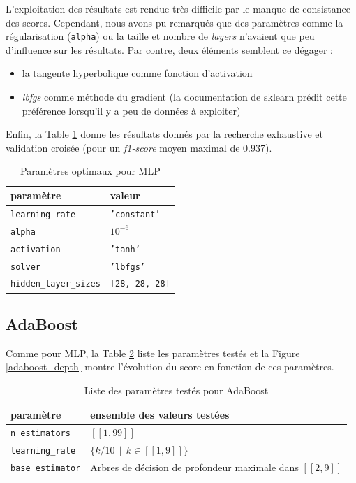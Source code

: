 \documentclass[a4paper]{report}
\begin{document}
L'exploitation des résultats est rendue très difficile par le manque de consistance des scores. Cependant, nous avons pu remarqués que des paramètres comme la régularisation (\texttt{alpha}) ou la taille et nombre de \emph{layers} n'avaient que peu d'influence sur les résultats. Par contre, deux éléments semblent ce dégager : \begin{itemize}
\item la tangente hyperbolique comme fonction d'activation
\item \emph{lbfgs} comme méthode du gradient (la documentation de sklearn prédit cette préférence lorsqu'il y a peu de données à exploiter)
\end{itemize}
Enfin, la Table \ref{best_params_mlp} donne les résultats donnés par la recherche exhaustive et validation croisée (pour un \emph{f1-score} moyen maximal de 0.937).

\begin{table}
\centering
\begin{tabular}{ll}
paramètre & valeur \\
\hline
\texttt{learning\_rate} & \texttt{'constant'} \\
\texttt{alpha} & \texttt{$10^{-6}$} \\
\texttt{activation} & \texttt{'tanh'} \\
\texttt{solver} & \texttt{'lbfgs'} \\
\texttt{hidden\_layer\_sizes} & \texttt{[28, 28, 28]}\\
\end{tabular}
\caption{Paramètres optimaux pour MLP\label{best_params_mlp}}
\end{table}

\subsection{AdaBoost}

Comme pour MLP, la Table \ref{params_ada} liste les paramètres testés et la Figure \ref{adaboost_depth} montre l'évolution du score en fonction de ces paramètres.

\begin{table}
\centering
\begin{tabular}{ll}
paramètre & ensemble des valeurs testées \\
\hline
\texttt{n\_estimators} & $[\![1, 99]\!]$ \\
\texttt{learning\_rate} & $\{k/10 \>\> | \>\> k \in [\![1, 9]\!] \}$ \\
\texttt{base\_estimator} & Arbres de décision de profondeur maximale dans $[\![2, 9]\!]$\\
\end{tabular}
\caption{Liste des paramètres testés pour AdaBoost\label{params_ada}}
\end{table}
\end{document}
